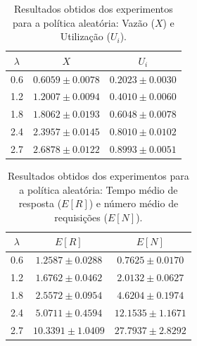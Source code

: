 \documentclass[conference]{IEEEtran}
\begin{document}
\begin{table}[H]
\centering
\caption{Resultados obtidos dos experimentos para a política aleatória: Vazão ($X$) e Utilização ($U_i$).}
\label{tab:simulations_random_throughput_utilization}
\begin{tabular}{ccc}
\toprule
$\lambda$ & $X$ & $U_i$ \\
\midrule
0.6 & $0.6059 \pm 0.0078$ & $0.2023 \pm 0.0030$ \\
1.2 & $1.2007 \pm 0.0094$ & $0.4010 \pm 0.0060$ \\
1.8 & $1.8062 \pm 0.0193$ & $0.6048 \pm 0.0078$ \\
2.4 & $2.3957 \pm 0.0145$ & $0.8010 \pm 0.0102$ \\
2.7 & $2.6878 \pm 0.0122$ & $0.8993 \pm 0.0051$ \\
\bottomrule
\end{tabular}
\end{table}

\begin{table}[H]
\centering
\caption{Resultados obtidos dos experimentos para a política aleatória: Tempo médio de resposta ($E[R]$) e número médio de requisições ($E[N]$).}
\label{tab:simulations_random_response_number}
\begin{tabular}{ccc}
\toprule
$\lambda$ & $E[R]$ & $E[N]$ \\
\midrule
0.6 & $1.2587 \pm 0.0288$ & $0.7625 \pm 0.0170$ \\
1.2 & $1.6762 \pm 0.0462$ & $2.0132 \pm 0.0627$ \\
1.8 & $2.5572 \pm 0.0954$ & $4.6204 \pm 0.1974$ \\
2.4 & $5.0711 \pm 0.4594$ & $12.1535 \pm 1.1671$ \\
2.7 & $10.3391 \pm 1.0409$ & $27.7937 \pm 2.8292$ \\
\bottomrule
\end{tabular}
\end{table}


\end{document}
